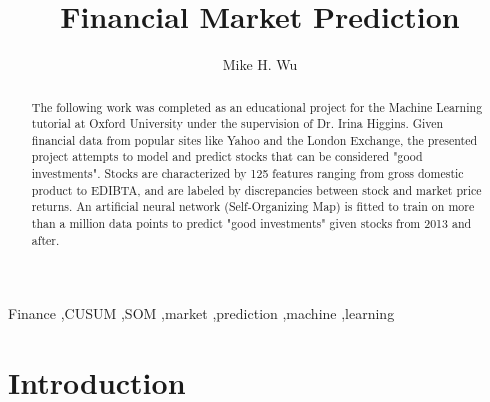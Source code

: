 \documentclass[preprint,12pt]{elsarticle}
\begin{document}
\begin{frontmatter}


\title{Financial Market Prediction}




\author{Mike H. Wu}

\address{New College, Oxford}

\begin{abstract}
The following work was completed as an educational project for the Machine Learning tutorial at Oxford University under the supervision of Dr. Irina Higgins. Given financial data from popular sites like Yahoo and the London Exchange, the presented project attempts to model and predict stocks that can be considered "good investments". Stocks are characterized by 125 features ranging from gross domestic product to EDIBTA, and are labeled by discrepancies between stock and market price returns. An artificial neural network (Self-Organizing Map) is fitted to train on more than a million data points to predict "good investments" given stocks from 2013 and after. 
\end{abstract}

\begin{keyword}
Finance \sep CUSUM \sep SOM \sep market \sep prediction \sep machine \sep learning
\end{keyword}

\end{frontmatter}

\section{Introduction}
\label{S:1}
\end{document}
